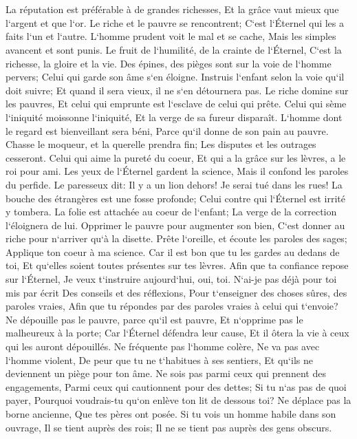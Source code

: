 \chapter{}

\verse La réputation est préférable à de grandes richesses, Et la grâce vaut mieux que l`argent et que l`or. 
\verse Le riche et le pauvre se rencontrent; C`est l`Éternel qui les a faits l`un et l`autre. 
\verse L`homme prudent voit le mal et se cache, Mais les simples avancent et sont punis. 
\verse Le fruit de l`humilité, de la crainte de l`Éternel, C`est la richesse, la gloire et la vie. 
\verse Des épines, des pièges sont sur la voie de l`homme pervers; Celui qui garde son âme s`en éloigne. 
\verse Instruis l`enfant selon la voie qu`il doit suivre; Et quand il sera vieux, il ne s`en détournera pas. 
\verse Le riche domine sur les pauvres, Et celui qui emprunte est l`esclave de celui qui prête. 
\verse Celui qui sème l`iniquité moissonne l`iniquité, Et la verge de sa fureur disparaît. 
\verse L`homme dont le regard est bienveillant sera béni, Parce qu`il donne de son pain au pauvre. 
\verse Chasse le moqueur, et la querelle prendra fin; Les disputes et les outrages cesseront. 
\verse Celui qui aime la pureté du coeur, Et qui a la grâce sur les lèvres, a le roi pour ami. 
\verse Les yeux de l`Éternel gardent la science, Mais il confond les paroles du perfide. 
\verse Le paresseux dit: Il y a un lion dehors! Je serai tué dans les rues! 
\verse La bouche des étrangères est une fosse profonde; Celui contre qui l`Éternel est irrité y tombera. 
\verse La folie est attachée au coeur de l`enfant; La verge de la correction l`éloignera de lui. 
\verse Opprimer le pauvre pour augmenter son bien, C`est donner au riche pour n`arriver qu`à la disette. 
\verse Prête l`oreille, et écoute les paroles des sages; Applique ton coeur à ma science. 
\verse Car il est bon que tu les gardes au dedans de toi, Et qu`elles soient toutes présentes sur tes lèvres. 
\verse Afin que ta confiance repose sur l`Éternel, Je veux t`instruire aujourd`hui, oui, toi. 
\verse N`ai-je pas déjà pour toi mis par écrit Des conseils et des réflexions, 
\verse Pour t`enseigner des choses sûres, des paroles vraies, Afin que tu répondes par des paroles vraies à celui qui t`envoie? 
\verse Ne dépouille pas le pauvre, parce qu`il est pauvre, Et n`opprime pas le malheureux à la porte; 
\verse Car l`Éternel défendra leur cause, Et il ôtera la vie à ceux qui les auront dépouillés. 
\verse Ne fréquente pas l`homme colère, Ne va pas avec l`homme violent, 
\verse De peur que tu ne t`habitues à ses sentiers, Et qu`ils ne deviennent un piège pour ton âme. 
\verse Ne sois pas parmi ceux qui prennent des engagements, Parmi ceux qui cautionnent pour des dettes; 
\verse Si tu n`as pas de quoi payer, Pourquoi voudrais-tu qu`on enlève ton lit de dessous toi? 
\verse Ne déplace pas la borne ancienne, Que tes pères ont posée. 
\verse Si tu vois un homme habile dans son ouvrage, Il se tient auprès des rois; Il ne se tient pas auprès des gens obscurs. 

